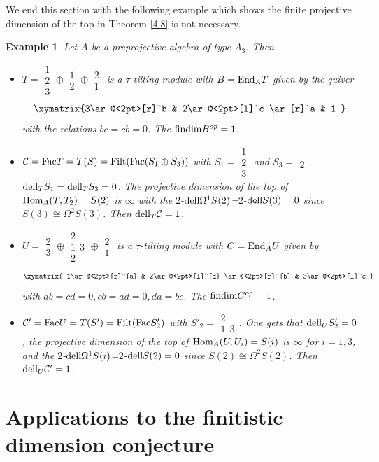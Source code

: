 \documentclass[a4paper]{amsart}
\newtheorem{exm}[thm]{Example}
\theoremstyle{definition}
\theoremstyle{remark}
\numberwithin{equation}{section}
\begin{document}
We end this section with the following example which shows the finite projective dimension of the top in Theorem \ref{4.8} is not necessary.

\begin{exm}\label{4.11} Let $A$ be a preprojective algebra of type $A_3$. Then
\begin{itemize}
    \item [(1)] $T=\substack{1\\2\\3}\oplus\substack{1\\2}\oplus\substack{2\\1}$ is a $\tau$-tilting module with $B=\textup{End}_A T$ given by the quiver \[\xymatrix{3\ar@<2pt>[r]^b & 2\ar@<2pt>[l]^c \ar[r]^a & 1 }\] with the relations $bc=cb=0$. The ${\rm findim}B^{op}=1$.
    \item [(2)] $\mathcal{C}=\textup{Fac}T=T(S)=\textup{Filt}(\textup{Fac}(S_1\oplus S_3))$ with $S_1=\substack{1\\2\\3}$ and $S_3=\substack{\ \\2}$, $\textup{dell}_T S_1=\textup{dell}_T S_3=0$. The projective dimension of the top of $\textup{Hom}_A(T, T_2 )=S(2)$ is $\infty$ with the $2$-$\textup{dell}\Omega^1 S(2)$=$2$-$\textup{dell}S(3)=0$ since $S(3)\cong \Omega^2 S(3)$. Then $\textup{dell}_T\mathcal{C}=1$.
    \item [(3)] $U=\substack{2\\3}\oplus\substack{2\\1\ \  3\\2}\oplus\substack{2\\1}$ is a $\tau$-tilting module with $C=\textup{End}_A U$ given by\[\xymatrix{
1\ar@<2pt>[r]^{a} & 2\ar@<2pt>[l]^{d} \ar@<2pt>[r]^{b} & 3\ar@<2pt>[l]^c
}\] with $ab=cd=0, cb=ad=0, da=bc$. The ${\rm findim}C^{op}=1$.

\item [(4)] $\mathcal{C'}=\textup{Fac}U=T(S')=\textup{Filt}(\textup{Fac}S'_2)$ with $S'_2=\substack{2\\1\ \ 3}$. One gets that $\textup{dell}_U S'_2=0$, the projective dimension of the top of $\textup{Hom}_A(U, U_i )=S(i)$ is $\infty$ for $i=1, 3$, and the  $2$-$\textup{dell}\Omega^1 S(i)$=$2$-$\textup{dell}S(2)=0$ since $S(2)\cong \Omega^2 S(2)$. Then $\textup{dell}_U\mathcal{C'}=1$.
\end{itemize}
\end{exm}

\section{Applications to the finitistic dimension conjecture}
\end{document}

